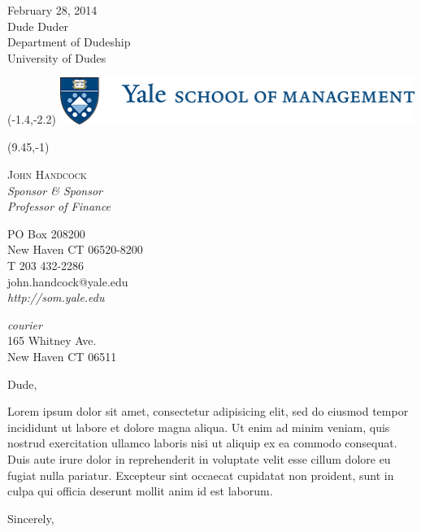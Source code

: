 \documentclass[letterpaper]{letter}
\date{}
\begin{document}
\begin{letter}{
	February 28, 2014\\\bigskip
	Dude Duder\\
	Department of Dudeship\\
	University of Dudes
}
                           
\begin{textblock}{4}(-1.4,-2.2)
\noindent
\hspace*{-0.35cm}\includegraphics[width=4.55in]{img/yale-som-logo.png}
\end{textblock}

{
	\footnotesize
	\begin{textblock}{3}(9.45,-1)
		{
			\color{yaleblue}
			\noindent
			\textsc{John Handcock}\\
			\emph{Sponsor \& Sponsor\\Professor of Finance}

			PO  Box 208200\\
			New Haven CT 06520-8200\\
			T 203 432-2286\\
			john.handcock@yale.edu\\
			{\em http://som.yale.edu}

			{\em courier}\\
			165 Whitney Ave.\\
			New Haven CT 06511\\
		}
	\end{textblock}
}

	\opening{Dude,}

Lorem ipsum dolor sit amet, consectetur adipisicing elit, sed do eiusmod tempor incididunt ut labore et dolore magna aliqua. Ut enim ad minim veniam, quis nostrud exercitation ullamco laboris nisi ut aliquip ex ea commodo consequat. Duis aute irure dolor in reprehenderit in voluptate velit esse cillum dolore eu fugiat nulla pariatur. Excepteur sint occaecat cupidatat non proident, sunt in culpa qui officia deserunt mollit anim id est laborum.


\closing{\vspace{1cm}Sincerely,}
\end{letter}
\end{document}

